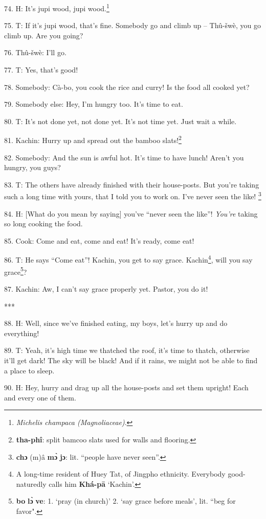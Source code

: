 74. H: It's jupi wood, jupi wood.\footnote{\textit{Michelis champaca (Magnoliaceae)}.}

75. T: If it's jupi wood, that's fine. Somebody go and climb up -- Thû-šwè,
you go climb up. Are you going?

76. Thû-šwè: I'll go.

77. T: Yes, that's good!

78. Somebody: Cà-bo, you cook the rice and curry! Is the food all cooked yet?

79. Somebody else: Hey, I'm hungry too. It's time to eat.

80. T: It's not done yet, not done yet. It's not time yet. Just wait a while.

81. Kachin: Hurry up and spread out the bamboo slats!\footnote{\textbf{tha-phî}: split bamcoo slats used for walls and flooring.}

82. Somebody: And the sun is awful hot. It's time to have lunch! Aren't you hungry,
you guys?

83. T: The others have already finished with their house-posts. But you're taking
such a long time with yours, that I told you to work on. I've never seen the like!
\footnote{\textbf{chɔ} (m)â \textbf{mɔ̀} \textbf{jɔ}: lit. ``people have never seen''.}

84. H: [What do you mean by saying] you've ``never seen the like''!
\textit{You're} taking so long cooking the food.

85. Cook: Come and eat, come and eat! It's ready, come eat!

86. T: He says ``Come eat''! Kachin, you get to say grace. Kachin\footnote{A long-time resident of Huey Tat, of Jingpho ethnicity. Everybody good-naturedly calls him \textbf{Khá-pā} `Kachin'.}, will
you say grace\footnote{\textbf{bo} \textbf{lɔ̀} \textbf{ve}: 1. `pray (in church)' 2. `say grace before meals', lit. ``beg for favor".}?

87. Kachin: Aw, I can't say grace properly yet. Pastor, you do it!

***

88. H: Well, since we've finished eating, my boys, let's hurry up and do everything!

89. T: Yeah, it's high time we thatched the roof, it's time to thatch, otherwise
it'll get dark! The sky will be black! And if it rains, we might not be able
to find a place to sleep.

90. H: Hey, hurry and drag up all the house-posts and set them upright! Each and
every one of them.

